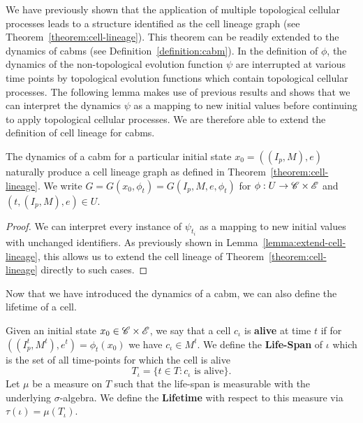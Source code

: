 We have previously shown that the application of multiple topological cellular processes leads to
a structure identified as the cell lineage graph (see Theorem~\ref{theorem:cell-lineage}).
This theorem can be readily extended to the dynamics of \acp{cabm} (see
Definition~\ref{definition:cabm}).
In the definition of $\phi$, the dynamics of the non-topological evolution function $\psi$ are
interrupted at various time points by topological evolution functions which contain topological
cellular processes.
The following lemma makes use of previous results and shows that we can interpret the dynamics
$\psi$ as a mapping to new initial values before continuing to apply topological cellular processes.
We are therefore able to extend the definition of cell lineage for \acp{cabm}.

\begin{lemma}
    The dynamics of a \ac{cabm} for a particular initial state $x_0=((I_p,M),e)$ naturally produce a
    cell lineage graph as defined in Theorem~\ref{theorem:cell-lineage}.
    We write $G=G(x_0,\phi_t)=G(I_p,M,e,\phi_t)$ for
    $\phi:U\rightarrow\mathscr{C}\times\mathscr{E}$ and $(t,(I_p,M),e)\in U$.
    \label{lemma:cell-lineage-for-cabms}
\end{lemma}
\begin{proof}
    We can interpret every instance of $\psi_{t_i}$ as a mapping to new initial values with
    unchanged identifiers.
    As previously shown in Lemma~\ref{lemma:extend-cell-lineage}, this allows us to extend the cell
    lineage of Theorem~\ref{theorem:cell-lineage} directly to such cases.
\end{proof}

Now that we have introduced the dynamics of a \ac{cabm}, we can also define the lifetime of a cell.

\begin{definition}
    Given an initial state $x_0\in\mathscr{C}\times\mathscr{E}$, we say that a cell $c_\iota$ is
    \textbf{alive} at time $t$ if for $((I_p^t,M^t),e^t)=\phi_t(x_0)$ we have $c_\iota\in M^t$.
    We define the \textbf{Life-Span} of $\iota$ which is the set of all time-points for which the
    cell is alive
    \begin{equation}
        T_\iota=\{t\in T: c_\iota \text{ is alive}\}.
    \end{equation}
    Let $\mu$ be a measure on $T$ such that the life-span is measurable with the underlying
    $\sigma$-algebra.
    We define the \textbf{Lifetime} with respect to this measure via
    $\tau(\iota)=\mu\left(T_\iota\right)$.
    \label{definition:cellular-lifetime}
\end{definition}

